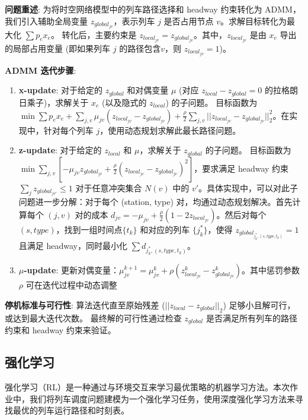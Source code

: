 \documentclass{article}
\begin{document}
\textbf{问题重述}:
为将时空网络模型中的列车路径选择和 headway 约束转化为 ADMM，我们引入辅助全局变量
$z_{global_{jv}}$，表示列车 $j$ 是否占用节点 $v$。求解目标转化为最大化 $\sum p_e x_e$。
转化后，主要约束是 $z_{local_{jv}} = z_{global_{jv}}$。其中，$z_{local_{jv}}$ 是由
$x_e$ 导出的局部占用变量 (即如果列车 $j$ 的路径包含$v$，则 $z_{local_{jv}}=1$)。

\textbf{ADMM 迭代步骤}:
\begin{enumerate}
    \item \textbf{x-update}:
        对于给定的 $z_{global}$ 和对偶变量 $\mu$ (对应
        $z_{local} - z_{global} = 0$ 的拉格朗日乘子)，求解关于
        $x_e$ (以及隐式的 $z_{local}$) 的子问题。
        目标函数为 $\min \sum p_e x_e + \sum_{j,v} \mu_{jv}
        (z_{local_{jv}} - z_{global_{jv}}) +
        \frac{\rho}{2} \sum_{j,v} ||z_{local_{jv}} -
        z_{global_{jv}}||_2^2$。在实现中，针对每个列车
        $j$，使用动态规划求解此最长路径问题。
    \item \textbf{z-update}:
        对于给定的 $z_{local}$ 和 $\mu$，求解关于 $z_{global}$ 的子问题。
        目标函数为 $\min \sum_{j,v} [-\mu_{jv}
            z_{global_{jv}} + \frac{\rho}{2}
        (z_{local_{jv}} - z_{global_{jv}})^2]$，要求满足
        headway 约束 $\sum_{j} z_{global_{jv'}} \le 1$
        对于任意冲突集合 $N(v)$ 中的 $v'$。具体实现中，可以对此子问题进一步分解：对于每个 (station, type)
        对，均通过动态规划解决。首先计算每个 $(j,v)$ 对的成本 $d_{jv} =-\mu_{jv} +
        \frac{\rho}{2} (1 - 2
        z_{local_{jv}})$。然后对每个 $(s, type)$，找到一组时间点$\{t_k\}$ 和对应的列车
        $\{j_k^*\}$，使得
        $z_{global_{j_k^*, (s,type,t_k)}}=1$ 且满足 headway，同时最小化 $\sum
        d_{j_k^*, (s,type,t_k)}$。
    \item \textbf{$\mu$-update}:
        更新对偶变量：$\mu_{jv}^{k+1} = \mu_{jv}^k + \rho
        (z_{local_{jv}}^k - z_{global_{jv}}^k)$。其中惩罚参数 $\rho$ 可在迭代过程中动态调整
\end{enumerate}

\textbf{停机标准与可行性}:
算法迭代直至原始残差 ($||z_{local} - z_{global}||_2$) 足够小且解可行，或达到最大迭代次数。
最终解的可行性通过检查 $z_{global}$ 是否满足所有列车的路径约束和 headway 约束来验证。

\subsection{强化学习}

强化学习（RL）是一种通过与环境交互来学习最优策略的机器学习方法。本次作业中，我们将列车调度问题建模为一个强化学习任务，使用深度强化学习方法来寻找最优的列车运行路径和时刻表。
\end{document}
